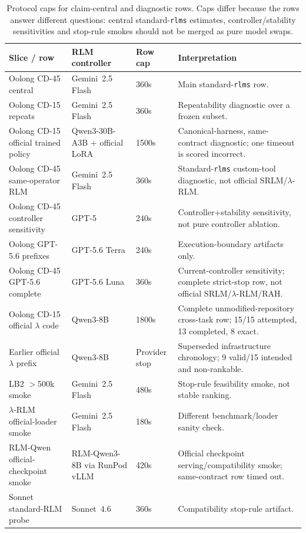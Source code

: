 \documentclass[letterpaper]{article}
\begin{document}
\begin{table}[!t]
\centering
\small
\setlength{\tabcolsep}{3pt}
\begin{tabular}{@{}p{4.0cm}p{3.4cm}p{2.0cm}p{6.3cm}@{}}
\toprule
\textbf{Slice / row} & \textbf{RLM controller} & \textbf{Row cap} & \textbf{Interpretation} \\
\midrule
Oolong CD-45 central & Gemini~2.5 Flash & 360s & Main standard-\texttt{rlms} row. \\
Oolong CD-15 repeats & Gemini~2.5 Flash & 360s & Repeatability diagnostic over a frozen subset. \\
Oolong CD-15 official trained policy & Qwen3-30B-A3B + official LoRA & 1500s & Canonical-harness, same-contract diagnostic; one timeout is scored incorrect. \\
Oolong CD-45 same-operator RLM & Gemini~2.5 Flash & 360s & Standard-\texttt{rlms} custom-tool diagnostic, not official SRLM/$\lambda$-RLM. \\
Oolong CD-45 controller sensitivity & GPT-5 & 240s & Controller+stability sensitivity, not pure controller ablation. \\
Oolong GPT-5.6 prefixes & GPT-5.6 Terra & 240s & Execution-boundary artifacts only. \\
Oolong CD-45 GPT-5.6 complete & GPT-5.6 Luna & 360s & Current-controller sensitivity; complete strict-stop row, not official SRLM/$\lambda$-RLM/RAH. \\
Oolong CD-15 official $\lambda$ code & Qwen3-8B & 1800s & Complete unmodified-repository cross-task row; 15/15 attempted, 13 completed, 8 exact. \\
Earlier official $\lambda$ prefix & Qwen3-8B & Provider stop & Superseded infrastructure chronology; 9 valid/15 intended and non-rankable. \\
LB2 $>$500k smoke & Gemini~2.5 Flash & 480s & Stop-rule feasibility smoke, not stable ranking. \\
$\lambda$-RLM official-loader smoke & Gemini~2.5 Flash & 180s & Different benchmark/loader sanity check. \\
RLM-Qwen official-checkpoint smoke & RLM-Qwen3-8B via RunPod vLLM & 420s & Official checkpoint serving/compatibility smoke; same-contract row timed out. \\
Sonnet standard-RLM probe & Sonnet~4.6 & 360s & Compatibility stop-rule artifact. \\
\bottomrule
\end{tabular}
\caption{Protocol caps for claim-central and diagnostic rows. Caps differ because the rows answer different questions: central standard-\texttt{rlms} estimates, controller/stability sensitivities and stop-rule smokes should not be merged as pure model swaps.}
\label{tab:supp-protocol-caps}
\end{table}
\end{document}
